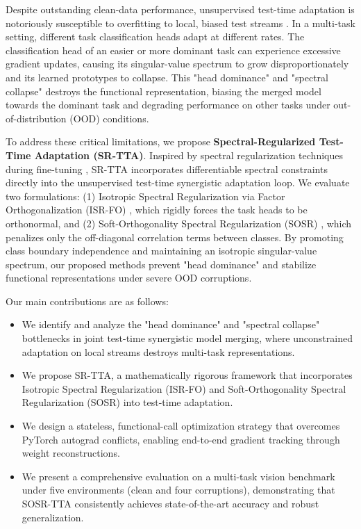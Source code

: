 \documentclass{article}
\theoremstyle{plain}
\theoremstyle{definition}
\theoremstyle{remark}
\begin{document}
Despite outstanding clean-data performance, unsupervised test-time adaptation is notoriously susceptible to overfitting to local, biased test streams \cite{lialin2023scaling,goddard2024mergekit}. In a multi-task setting, different task classification heads adapt at different rates. The classification head of an easier or more dominant task can experience excessive gradient updates, causing its singular-value spectrum to grow disproportionately and its learned prototypes to collapse. This "head dominance" and "spectral collapse" destroys the functional representation, biasing the merged model towards the dominant task and degrading performance on other tasks under out-of-distribution (OOD) conditions.

To address these critical limitations, we propose \textbf{Spectral-Regularized Test-Time Adaptation (SR-TTA)}. Inspired by spectral regularization techniques during fine-tuning \cite{hu2022lora,marczak2025sharpness}, SR-TTA incorporates differentiable spectral constraints directly into the unsupervised test-time synergistic adaptation loop. We evaluate two formulations: (1) Isotropic Spectral Regularization via Factor Orthogonalization (ISR-FO) \cite{loshchilov2019decoupled,panariello2025accurate}, which rigidly forces the task heads to be orthonormal, and (2) Soft-Orthogonality Spectral Regularization (SOSR) \cite{stoica2025knots,shah2023ziplora}, which penalizes only the off-diagonal correlation terms between classes. By promoting class boundary independence and maintaining an isotropic singular-value spectrum, our proposed methods prevent "head dominance" and stabilize functional representations under severe OOD corruptions.

Our main contributions are as follows:
\begin{itemize}
  \item We identify and analyze the "head dominance" and "spectral collapse" bottlenecks in joint test-time synergistic model merging, where unconstrained adaptation on local streams destroys multi-task representations.
  \item We propose SR-TTA, a mathematically rigorous framework that incorporates Isotropic Spectral Regularization (ISR-FO) and Soft-Orthogonality Spectral Regularization (SOSR) into test-time adaptation.
  \item We design a stateless, functional-call optimization strategy that overcomes PyTorch autograd conflicts, enabling end-to-end gradient tracking through weight reconstructions.
  \item We present a comprehensive evaluation on a multi-task vision benchmark under five environments (clean and four corruptions), demonstrating that SOSR-TTA consistently achieves state-of-the-art accuracy and robust generalization.
\end{itemize}
\end{document}
